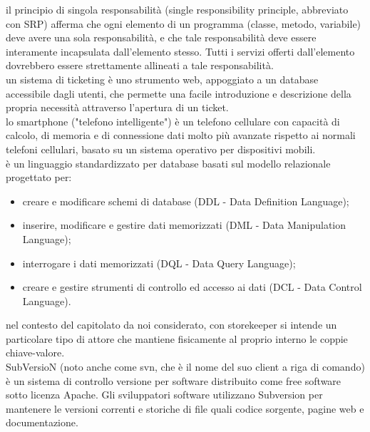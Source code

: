 \documentclass{scalatekids-article}
\begin{document}
   il principio di singola responsabilità (single responsibility principle, abbreviato con SRP) afferma che ogni elemento di un programma (classe, metodo, variabile) deve avere una sola responsabilità, e che tale responsabilità deve essere interamente incapsulata dall'elemento stesso. Tutti i servizi offerti dall'elemento dovrebbero essere strettamente allineati a tale responsabilità.
  \\
  
   un sistema di ticketing è uno strumento web, appoggiato a un database accessibile dagli utenti, che permette una facile introduzione e descrizione della propria necessità attraverso l’apertura di un ticket.
  \\

   lo smartphone ("telefono intelligente") è un telefono cellulare con capacità di calcolo, di memoria e di connessione dati molto più avanzate rispetto ai normali telefoni cellulari, basato su un sistema operativo per dispositivi mobili.
  \\

   è un linguaggio standardizzato per database basati sul modello relazionale progettato per:
  \begin{itemize}
  	\item creare e modificare schemi di database (DDL - Data Definition Language);
  	\item inserire, modificare e gestire dati memorizzati (DML - Data Manipulation Language);
  	\item interrogare i dati memorizzati (DQL - Data Query Language);
  	\item creare e gestire strumenti di controllo ed accesso ai dati (DCL - Data Control Language).
  \end{itemize}

   nel contesto del capitolato da noi considerato, con storekeeper si intende un particolare tipo di attore che mantiene fisicamente al proprio interno le coppie chiave-valore.
  \\

   SubVersioN (noto anche come svn, che è il nome del suo client a riga di comando) è un sistema di controllo versione per software distribuito come free software sotto licenza Apache.
  Gli sviluppatori software utilizzano Subversion per mantenere le versioni correnti e storiche di file quali codice sorgente, pagine web e documentazione.
  \\
\end{document}
